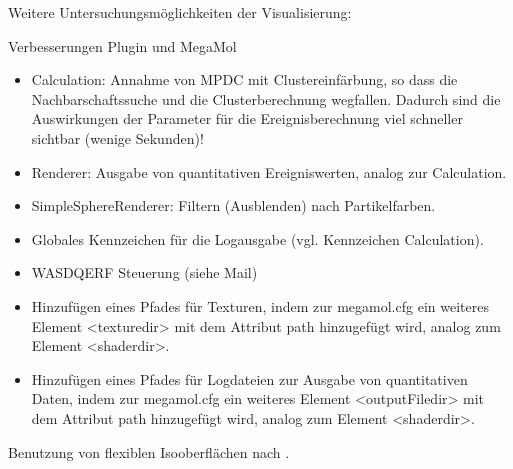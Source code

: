 Weitere Untersuchungsmöglichkeiten der Visualisierung:

Verbesserungen Plugin und MegaMol
\begin{itemize}
	\item Calculation: Annahme von MPDC mit Clustereinfärbung, so dass die Nachbarschaftssuche und die Clusterberechnung wegfallen. Dadurch sind die Auswirkungen der Parameter für die Ereignisberechnung viel schneller sichtbar (wenige Sekunden)!
	\item Renderer: Ausgabe von quantitativen Ereigniswerten, analog zur Calculation.
	\item SimpleSphereRenderer: Filtern (Ausblenden) nach Partikelfarben.
	\item Globales Kennzeichen für die Logausgabe (vgl. Kennzeichen Calculation).\textbf{}
	\item WASDQERF Steuerung (siehe Mail)
	\item Hinzufügen eines Pfades für Texturen, indem zur megamol.cfg ein weiteres Element <texturedir> mit dem Attribut path hinzugefügt wird, analog zum Element <shaderdir>.
	\item Hinzufügen eines Pfades für Logdateien zur Ausgabe von quantitativen Daten, indem zur megamol.cfg ein weiteres Element <outputFiledir> mit dem Attribut path hinzugefügt wird, analog zum Element <shaderdir>.
\end{itemize}

Benutzung von flexiblen Isooberflächen nach \cite{carr2010flexibleIsosurfaces}.



